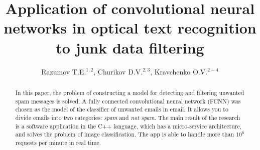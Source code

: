 \documentclass[12pt]{jpconf}
\begin{document}
\title{Application of convolutional neural networks in optical text recognition to junk data filtering}
\author{Razumov T.E.$^{1,2}$, Churikov D.V.$^{2,3}$, Kravchenko O.V.$^{2-4}$}

\address{
$^1$\,Mail.ru Group, Leningradsky pr., 39--79, Moscow, 125167, Russian Federation\\
$^2$\,Scientific and Technological Centre of Unique Instrumentation, Butlerova str., 15, Moscow, 117342, Russian Federation\\
$^3$\,Kotel'nikov Institute of Radio Engineering and Electronics of RAS, Mokhovaya st. 11--7,
Moscow, 125009, Russian Federation\\
$^4$\,Federal Research Center ``Computer Science and Control'' of RAS, Vavilova st., 40, Moscow, 119333, Russian Federation
}



\begin{abstract}
	In this paper, the problem of constructing a model for detecting and filtering unwanted spam messages is solved. A fully connected convolutional neural network ({FCNN}) was chosen as the model of the classifier of unwanted emails in email. It allows you to divide emails into two categories: \emph{spam} and \emph{not spam}.
	The main result of the research is a software application in the \textsf{C++} language, which has a micro-service architecture, and solves the problem of image classification. The app is able to handle more than $10 ^ 6 $ requests per minute in real time.
\end{abstract}

\end{document}
